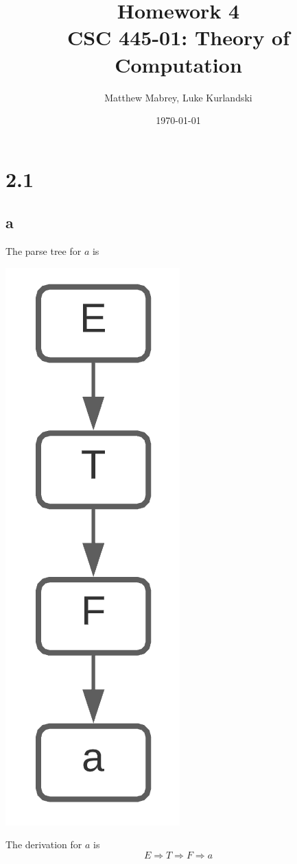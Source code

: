 \documentclass{article}
\title{Homework 4\\[0.2em]\smaller{}CSC 445-01: Theory of Computation}
\author{Matthew Mabrey, Luke Kurlandski}
\date{\today}
\begin{document}
\maketitle

\section*{2.1}


\subsection*{a}
The parse tree for $a$ is
\begin{center}
    \includegraphics[scale=.65]{21a.png}
\end{center}
The derivation for $a$ is
$$E \Rightarrow T \Rightarrow F \Rightarrow a$$
\end{document}
